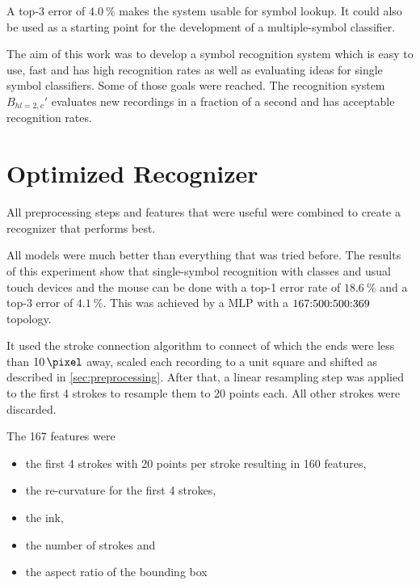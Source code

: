 A top-3 error of $\SI{4.0}{\percent}$ makes the system usable for symbol
lookup. It could also be used as a starting point for the development of a
multiple-symbol classifier.

The aim of this work was to develop a symbol recognition system which is easy
to use, fast and has high recognition rates as well as evaluating ideas for
single symbol classifiers. Some of those goals were reached. The recognition
system $B_{hl=2,c}'$ evaluates new recordings in a fraction of a second and has
acceptable recognition rates.


\section{Optimized Recognizer}
All preprocessing steps and features that were useful were combined to create a
recognizer that performs best.

All models were much better than everything that was tried before. The results
of this experiment show that single-symbol recognition with
\totalClassesAnalyzed{} classes and usual touch devices and the mouse can be
done with a top-1 error rate of $\SI{18.6}{\percent}$ and a top-3 error of
$\SI{4.1}{\percent}$. This was
achieved by a \gls{MLP} with a $167{:}500{:}500{:}369{}$ topology.

It used the stroke connection algorithm to connect of which the ends were less
than $\SI{10}{\pixel}$ away, scaled each recording to a unit square and shifted
as described in \ref{sec:preprocessing}. After that, a linear resampling step
was applied to the first 4 strokes to resample them to 20 points each. All
other strokes were discarded.

\goodbreak
The 167 features were\mynobreakpar%
\begin{itemize}
     \item the first 4 strokes with 20 points per stroke resulting in 160
           features,
     \item the re-curvature for the first 4 strokes,
     \item the ink,
     \item the number of strokes and
     \item the aspect ratio of the bounding box
\end{itemize}


